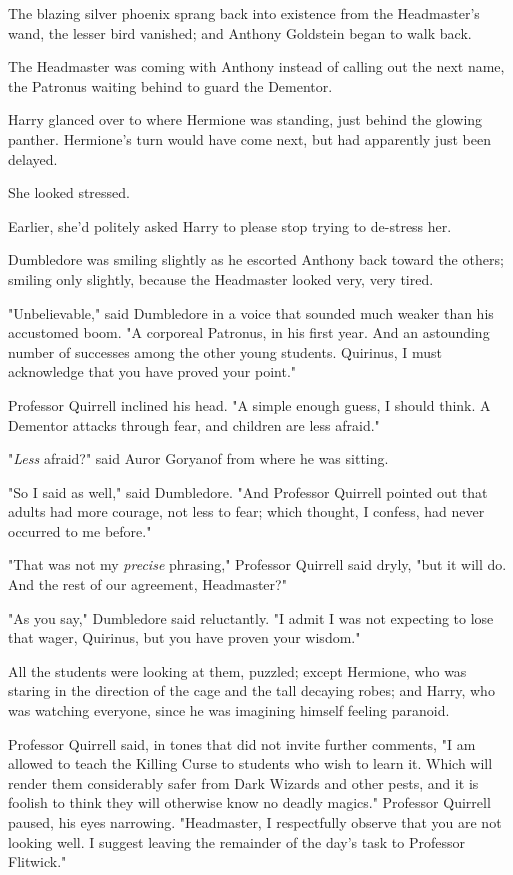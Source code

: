 The blazing silver phoenix sprang back into existence from the Headmaster's
wand, the lesser bird vanished; and Anthony Goldstein began to walk back.

The Headmaster was coming with Anthony instead of calling out the next name,
the Patronus waiting behind to guard the Dementor.

Harry glanced over to where Hermione was standing, just behind the glowing
panther. Hermione's turn would have come next, but had apparently just been
delayed.

She looked stressed.

Earlier, she'd politely asked Harry to please stop trying to de-stress her.

Dumbledore was smiling slightly as he escorted Anthony back toward the others;
smiling only slightly, because the Headmaster looked very, very tired.

"Unbelievable," said Dumbledore in a voice that sounded much weaker than his
accustomed boom. "A corporeal Patronus, in his first year. And an astounding
number of successes among the other young students. Quirinus, I must
acknowledge that you have proved your point."

Professor Quirrell inclined his head. "A simple enough guess, I should think. A
Dementor attacks through fear, and children are less afraid."

"\emph{Less} afraid?" said Auror Goryanof from where he was sitting.

"So I said as well," said Dumbledore. "And Professor Quirrell pointed out that
adults had more courage, not less to fear; which thought, I confess, had never
occurred to me before."

"That was not my \emph{precise} phrasing," Professor Quirrell said dryly, "but
it will do. And the rest of our agreement, Headmaster?"

"As you say," Dumbledore said reluctantly. "I admit I was not expecting to lose
that wager, Quirinus, but you have proven your wisdom."

All the students were looking at them, puzzled; except Hermione, who was
staring in the direction of the cage and the tall decaying robes; and Harry,
who was watching everyone, since he was imagining himself feeling paranoid.

Professor Quirrell said, in tones that did not invite further comments, "I am
allowed to teach the Killing Curse to students who wish to learn it. Which will
render them considerably safer from Dark Wizards and other pests, and it is
foolish to think they will otherwise know no deadly magics." Professor Quirrell
paused, his eyes narrowing. "Headmaster, I respectfully observe that you are
not looking well. I suggest leaving the remainder of the day's task to
Professor Flitwick."

